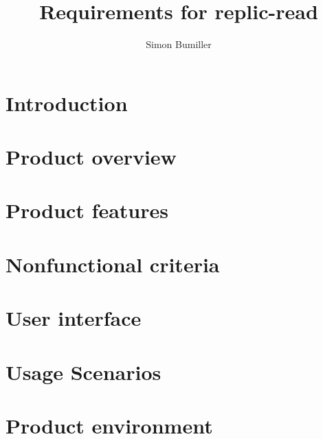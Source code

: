 \documentclass{article}
\title{Requirements for replic-read}
\author{Simon Bumiller}
\begin{document}
    \maketitle
    \newpage

    \setcounter{tocdepth}{2}
    \tableofcontents
    \newpage
    \listoffigures
    \newpage


    \section{Introduction}\label{sec:introduction}
    


    \section{Product overview}\label{sec:product-overview}
    


    \section{Product features}\label{sec:product-features}
    


    \section{Nonfunctional criteria}\label{sec:nonfunctional-criteria}
    


    \section{User interface}\label{sec:user-interface}
    


    \section{Usage Scenarios}\label{sec:usage-scenarios}
    


    \section{Product environment}\label{sec:product-environment}
    
\end{document}
